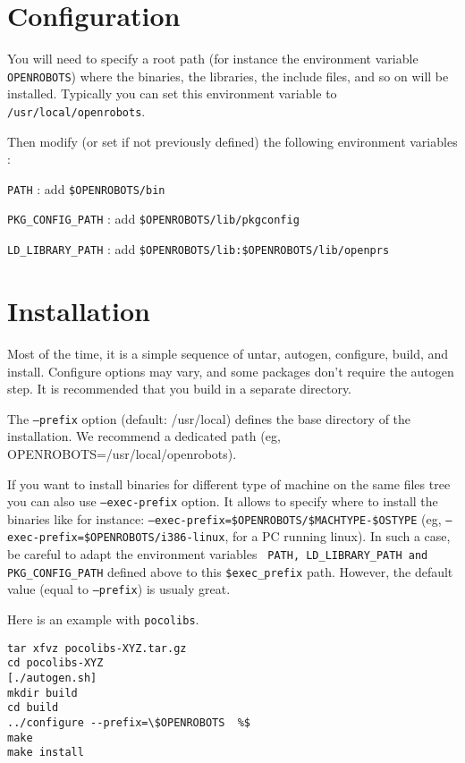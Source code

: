 \section{Configuration}
\label{sec|configuration|configuration}


You will need to specify a root path (for instance the environment
variable {\tt OPENROBOTS}) where the binaries, the libraries, the
include files, and so on will be installed. Typically you can set this
environment variable to {\tt /usr/local/openrobots}.

Then modify (or set if not previously defined) the following 
environment variables :

{\tt PATH} :  add {\tt \$OPENROBOTS/bin}

{\tt PKG\_CONFIG\_PATH} :  add  {\tt \$OPENROBOTS/lib/pkgconfig}

{\tt LD\_LIBRARY\_PATH} :  add  {\tt \$OPENROBOTS/lib:\$OPENROBOTS/lib/openprs}



\section{Installation}
\label{sec|configuration|installation}

Most of the time, it is a simple sequence of untar, autogen, configure,
build, and install. Configure options may vary, and some packages don't
require the autogen step. It is recommended that you build in a separate
directory. 

The {\tt --prefix} option (default: /usr/local) defines the base directory
of the installation. We recommend a dedicated path (eg,
OPENROBOTS=/usr/local/openrobots).

If you want to install binaries for different type of machine
on the same files tree you can also use {\tt --exec-prefix}
option. It allows to specify where to install the binaries like for
instance: {\tt --exec-prefix=\$OPENROBOTS/\$MACHTYPE-\$OSTYPE} (eg,
{\tt --exec-prefix=\$OPENROBOTS/i386-linux}, for a PC running linux).
In such a case, be careful to adapt the environment variables {\tt
PATH, LD\_LIBRARY\_PATH and PKG\_CONFIG\_PATH} defined above to this
{\tt \$exec\_prefix} path.
However, the default value (equal to {\tt --prefix}) is usualy great. 


Here is an
example with {\tt pocolibs}. 

\begin{cartouche}
\begin{verbatim}
tar xfvz pocolibs-XYZ.tar.gz
cd pocolibs-XYZ
[./autogen.sh]
mkdir build
cd build
../configure --prefix=\$OPENROBOTS  %$
make
make install
\end{verbatim}
\end{cartouche}

